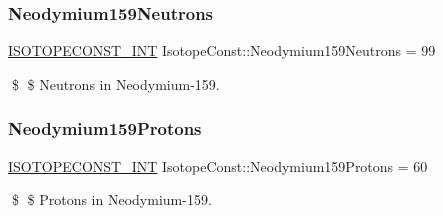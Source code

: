 \subsubsection{\texorpdfstring{Neodymium159\+Neutrons}{Neodymium159Neutrons}}
{\footnotesize\ttfamily \mbox{\hyperlink{group___isotope_const-_macros_ga5f18360b3e99483a35c32d789e62621c}{I\+S\+O\+T\+O\+P\+E\+C\+O\+N\+S\+T\+\_\+\+I\+NT}} Isotope\+Const\+::\+Neodymium159\+Neutrons = 99}

\$ \$ Neutrons in Neodymium-\/159. \mbox{\label{group___isotope_const-_neodymium-_nd159_ga4a635686660452cade862db9a4c87c1a}} 
\subsubsection{\texorpdfstring{Neodymium159\+Protons}{Neodymium159Protons}}
{\footnotesize\ttfamily \mbox{\hyperlink{group___isotope_const-_macros_ga5f18360b3e99483a35c32d789e62621c}{I\+S\+O\+T\+O\+P\+E\+C\+O\+N\+S\+T\+\_\+\+I\+NT}} Isotope\+Const\+::\+Neodymium159\+Protons = 60}

\$ \$ Protons in Neodymium-\/159. 
